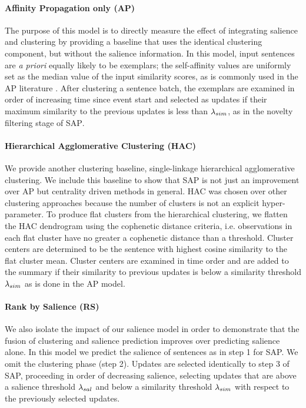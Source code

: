 \paragraph{Affinity Propagation only (\textsc{AP})} The purpose of this model
is to directly measure the effect of integrating salience and clustering by
providing a baseline that uses the identical clustering component, but without
the salience information. In this model, input sentences are \textit{a priori}
equally likely to be exemplars; the self-affinity values are uniformly set as
the median value of the  input similarity scores, as is commonly used in the
\textsc{AP} literature \citep{frey2007}. After clustering a sentence batch, the
exemplars are examined in order of increasing time since event start and
selected as updates if their maximum similarity to the previous updates is less
than ${\lambda_{sim}}$, as in the novelty filtering stage of \textsc{SAP}.

\paragraph{Hierarchical Agglomerative Clustering (HAC)} We provide another
clustering baseline, single-linkage hierarchical agglomerative clustering.  We
include this baseline to show that SAP is not just an improvement over
\textsc{AP} but centrality driven methods in general.  \textsc{HAC} was chosen
over other clustering approaches because the number of clusters is not an
explicit hyper-parameter. To produce flat clusters from the hierarchical
clustering, we flatten the \textsc{HAC} dendrogram using the cophenetic
distance criteria, i.e.  observations in each flat cluster have no greater a
cophenetic distance than a threshold. Cluster centers are determined to be the
sentence with highest cosine similarity to the flat cluster mean.  Cluster
centers are examined in time order and are added to the summary if their
similarity to previous updates is below a similarity threshold ${\lambda_{sim}}$ as
is done in the \textsc{AP} model.

\paragraph{Rank by Salience (RS)} We also isolate the impact of our salience
model in order to demonstrate that the fusion of clustering and salience
prediction improves over predicting salience alone. In this model we predict
the salience of sentences as in step 1 for SAP. We omit the clustering phase
(step 2).  Updates are selected identically to step 3 of SAP, proceeding in
order of decreasing salience, selecting updates that are above a salience
threshold ${\lambda_{sal}}$ and below a similarity threshold ${\lambda_{sim}}$ with respect
to the previously selected updates.


